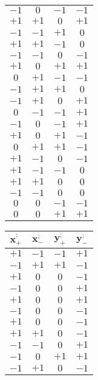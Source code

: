 \documentclass[11pt]{book}
\begin{document}
\begin{table}
\begin{tabular}{cccc}
        $-1$ & $0$ & $-1$ & $-1$\\
        $+1$ & $+1$ & $0$ & $+1$\\
        $-1$ & $-1$ & $+1$ & $0$\\
    $+1$ & $+1$ & $-1$ & $0$\\
        $-1$ & $-1$ & $0$ & $-1$\\
        $+1$ & $0$ & $+1$ & $+1$\\
        $0$ & $+1$ & $-1$ & $-1$\\
        $-1$ & $+1$ & $+1$ & $0$\\
        $-1$ & $+1$ & $0$ & $+1$\\
        $0$ & $-1$ & $-1$ & $+1$\\
    $-1$ & $0$ & $-1$ & $+1$\\
        $+1$ & $0$ & $+1$ & $-1$\\
        $0$ & $+1$ & $+1$ & $-1$\\
        $+1$ & $-1$ & $0$ & $-1$\\
        $+1$ & $-1$ & $-1$ & $0$\\
        $+1$ & $+1$ & $0$ & $0$\\
        $-1$ & $-1$ & $0$ & $0$\\
        $0$ & $0$ & $-1$ & $-1$\\
        $0$ & $0$ & $+1$ & $+1$\\
        \bottomrule
        \end{tabular}
                \hfill
\color[HTML]{468165}                
                \begin{tabular}{cccc}
        \toprule
        $\boldsymbol{x_{+}^{;}}$ & $\boldsymbol{x_{-}^{;}}$ & $\boldsymbol{y_{+}^{;}}$ & $\boldsymbol{y_{-}^{;}}$\\
        \midrule
        $+1$ & $-1$ & $-1$ & $+1$\\
        $-1$ & $+1$ & $+1$ & $-1$\\
        $+1$ & $0$ & $0$ & $-1$\\
        $-1$ & $0$ & $0$ & $+1$\\
        $+1$ & $0$ & $0$ & $+1$\\
    $-1$ & $0$ & $0$ & $-1$\\
        $+1$ & $0$ & $0$ & $-1$\\
        $+1$ & $+1$ & $0$ & $-1$\\
        $-1$ & $-1$ & $0$ & $+1$\\
        $-1$ & $0$ & $+1$ & $+1$\\
        $-1$ & $+1$ & $0$ & $-1$\\

\end{tabular}
\end{table}
\end{document}
